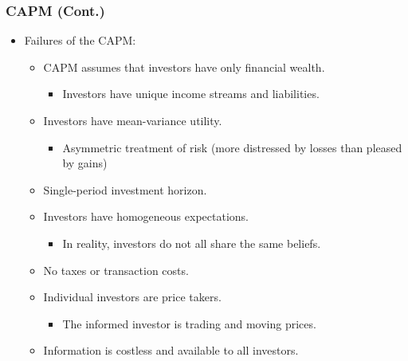 \subsubsection{CAPM (Cont.)}
\begin{itemize}
\item Failures of the CAPM:
    \begin{itemize}
    \item CAPM assumes that investors have only financial wealth.
        \begin{itemize}
        \item Investors have unique income streams and liabilities.
        \end{itemize}
    \item Investors have mean-variance utility.
        \begin{itemize}
        \item Asymmetric treatment of risk (more distressed by losses than pleased by gains)
        \end{itemize}
    \item Single-period investment horizon.
    \item Investors have homogeneous expectations.
        \begin{itemize}
        \item In reality, investors do not all share the same beliefs.
        \end{itemize}
    \item No taxes or transaction costs.
    \item Individual investors are price takers.
        \begin{itemize}
        \item The informed investor is trading and moving prices.
        \end{itemize}
    \item Information is costless and available to all investors.
    \end{itemize}
    
\end{itemize}



